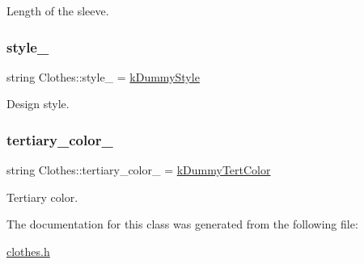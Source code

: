 Length of the sleeve. 

\mbox{\label{classClothes_aa85ed2b95110d8c477a1aca9cb403f98}} 
\subsubsection{\texorpdfstring{style\+\_\+}{style\_}}
{\footnotesize\ttfamily string Clothes\+::style\+\_\+ = \mbox{\hyperlink{clothes_8h_a9deec6ed1f40928bfa0040eeab95ed6b}{k\+Dummy\+Style}}\hspace{0.3cm}{\ttfamily [protected]}}



Design style. 

\mbox{\label{classClothes_a3c5f1e7ab531e3ba7a38b930da8078a0}} 
\subsubsection{\texorpdfstring{tertiary\+\_\+color\+\_\+}{tertiary\_color\_}}
{\footnotesize\ttfamily string Clothes\+::tertiary\+\_\+color\+\_\+ = \mbox{\hyperlink{clothes_8h_a094dde85547895fd70dafb3ab10c6783}{k\+Dummy\+Tert\+Color}}\hspace{0.3cm}{\ttfamily [protected]}}



Tertiary color. 



The documentation for this class was generated from the following file\+:\begin{DoxyCompactItemize}
\item 
\mbox{\hyperlink{clothes_8h}{clothes.\+h}}\end{DoxyCompactItemize}
